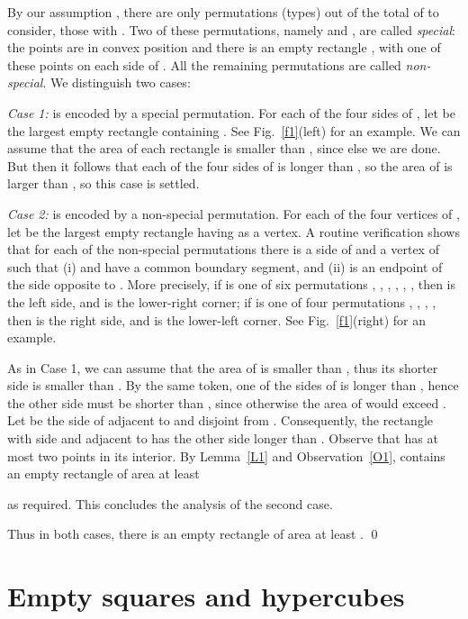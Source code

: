 \documentclass[11pt]{article}
\begin{document}
By our assumption , there are only 
permutations (types) out of the total of  to consider, those with
. 
Two of these permutations, namely  and , are
called {\em special}: the  points are in convex position and there
is an empty rectangle , with one of these points on each side of
. All the remaining  permutations are called {\em non-special}.
We distinguish two cases: 

\medskip
{\em Case 1:}  is encoded by a special permutation.
For each of the four sides  of , let  be the largest
empty rectangle containing .
See Fig.~\ref{f1}(left) for an example. 
We can assume that the area of each rectangle 
 is smaller than , since else we are done. But then it
follows that each of the four sides of  is longer than 
, so the area
of  is larger than ,
so this case is settled.

\medskip
{\em Case 2:}  is encoded by a non-special permutation.
For each of the four vertices  of , let  be the largest
empty rectangle having  as a vertex. A routine verification shows that for
each of the  non-special permutations there is a side  of 
and a vertex  of  such that (i)  and  have a common
boundary segment, and (ii)  is an endpoint of the side opposite to .
More precisely,
if  is one of six permutations
, , , 
, , , 
then  is the left side, and  is the lower-right corner;
if  is one of four permutations
, , , , 
then  is the right side, and  is the lower-left corner. 
See Fig.~\ref{f1}(right) for an example. 

As in Case 1, we can assume that
the area of  is smaller than , thus its shorter side
is smaller than . By the same token, one of the sides of  
is longer than , hence the other side must
be shorter than , 
since otherwise the area of  would exceed .
Let  be the side of  adjacent to  and disjoint from .
Consequently, the rectangle  with side  and adjacent to 
has the other side longer than . Observe
that  has at most two points in its interior. By Lemma~\ref{L1}
and Observation~\ref{O1},  contains an empty rectangle of area at
least 

as required. This concludes the analysis of the second case.

Thus in both cases, there is an empty rectangle of area at least .
\qed



\section{Empty squares and hypercubes}\label{sec:square}
\end{document}
